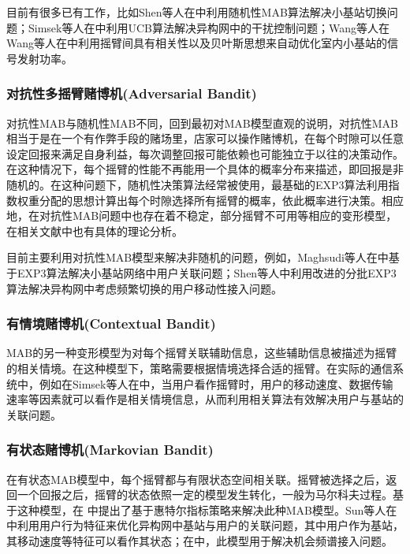 \documentclass{IEEEtran}
\begin{document}
目前有很多已有工作，比如Shen等人在\cite{Shen2017}中利用随机性MAB算法解决小基站切换问题；Simsek等人在\cite{Simsek2015a}中利用UCB算法解决异构网中的干扰控制问题；Wang等人在Wang等人在\cite{Wang2017}中利用摇臂间具有相关性以及贝叶斯思想来自动优化室内小基站的信号发射功率。

\subsubsection{对抗性多摇臂赌博机(Adversarial Bandit)}
对抗性MAB与随机性MAB不同，回到最初对MAB模型直观的说明，对抗性MAB相当于是在一个有作弊手段的赌场里，店家可以操作赌博机，在每个时隙可以任意设定回报来满足自身利益，每次调整回报可能依赖也可能独立于以往的决策动作。在这种情况下，每个摇臂的性能不再能用一个具体的概率分布来描述，即回报是非随机的。在这种问题下，随机性决策算法经常被使用，最基础的EXP3算法\cite{Auer2002}利用指数权重分配的思想计算出每个时隙选择所有摇臂的概率，依此概率进行决策。相应地，在对抗性MAB问题中也存在着不稳定，部分摇臂不可用等相应的变形模型，在相关文献中也有具体的理论分析。

目前主要利用对抗性MAB模型来解决非随机的问题，例如，Maghsudi等人在\cite{Maghsudi2017}中基于EXP3算法解决小基站网络中用户关联问题；Shen等人\cite{Shen2016}中利用改进的分批EXP3算法解决异构网中考虑频繁切换的用户移动性接入问题。

\subsubsection{有情境赌博机(Contextual Bandit)}
MAB的另一种变形模型为对每个摇臂关联辅助信息，这些辅助信息被描述为摇臂的相关情境。在这种模型下，策略需要根据情境选择合适的摇臂。在实际的通信系统中，例如在Simsek等人在\cite{Simsek2015a}中，当用户看作摇臂时，用户的移动速度、数据传输速率等因素就可以看作是相关情境信息，从而利用相关算法有效解决用户与基站的关联问题。



\subsubsection{有状态赌博机(Markovian Bandit)}
在有状态MAB模型中，每个摇臂都与有限状态空间相关联。摇臂被选择之后，返回一个回报之后，摇臂的状态依照一定的模型发生转化，一般为马尔科夫过程。基于这种模型，在 中提出了基于惠特尔指标策略来解决此种MAB模型。Sun等人在\cite{Sun2017}中利用用户行为特征来优化异构网中基站与用户的关联问题，其中用户作为基站，其移动速度等特征可以看作其状态；在\cite{Tekin2011}中，此模型用于解决机会频谱接入问题。
\end{document}
